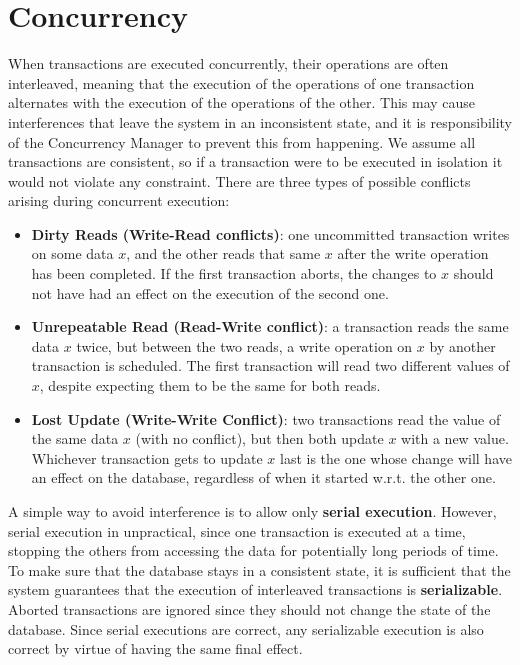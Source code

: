 \chapter{Concurrency}

When transactions are executed concurrently, their operations are often interleaved, meaning that the execution of the operations of one transaction alternates with the execution of the operations of the other. This may cause interferences that leave the system in an inconsistent state, and it is responsibility of the Concurrency Manager to prevent this from happening. We assume all transactions are consistent, so if a transaction were to be executed in isolation it would not violate any constraint. There are three types of possible conflicts arising during concurrent execution:
\begin{itemize}
    \item \textbf{Dirty Reads (Write-Read conflicts)}: one uncommitted transaction writes on some data $x$, and the other reads that same $x$ after the write operation has been completed. If the first transaction aborts, the changes to $x$ should not have had an effect on the execution of the second one.

    \item \textbf{Unrepeatable Read (Read-Write conflict)}: a transaction reads the same data $x$ twice, but between the two reads, a write operation on $x$ by another transaction is scheduled. The first transaction will read two different values of $x$, despite expecting them to be the same for both reads.

    \item \textbf{Lost Update (Write-Write Conflict)}: two transactions read the value of the same data $x$ (with no conflict), but then both update $x$ with a new value. Whichever transaction gets to update $x$ last is the one whose change will have an effect on the database, regardless of when it started w.r.t. the other one. 
\end{itemize}
A simple way to avoid interference is to allow only \textbf{serial execution}.
However, serial execution in unpractical, since one transaction is executed at a time, stopping the others from accessing the data for potentially long periods of time. To make sure that the database stays in a consistent state, it is sufficient that the system guarantees that the execution of interleaved transactions is \textbf{serializable}.
Aborted transactions are ignored since they should not change the state of the database. Since serial executions are correct, any serializable execution is also correct by virtue of having the same final effect.

